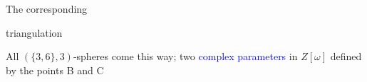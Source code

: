 \documentclass{beamer}
\begin{document}
\begin{frame}
\begin{center}
\begin{minipage}{3.9cm}
The corresponding
 
triangulation 
\end{minipage}
\end{center}  
\begin{center}
\begin{minipage}{3.4cm}
\par
\end{minipage}
\begin{minipage}{3.5cm}
All $(\{3,6\},3)$-spheres come this way; two \textcolor{blue}{complex parameters}
in $Z[\omega]$ defined by the points B
and C

\end{minipage}
\end{center}


\end{frame}
\end{document}
